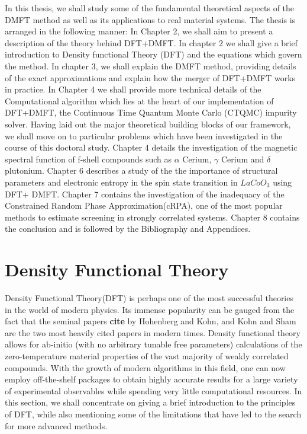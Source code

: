 \documentclass[12pt,a4paper]{article}
\begin{document}
In this thesis, we shall study some of the fundamental theoretical aspects of the DMFT method as well as its applications to real material systems. The thesis is arranged in the following manner: In Chapter 2, we shall aim to present a description of the theory behind DFT+DMFT. In chapter 2 we shall give a brief introduction to Density functional Theory (DFT) and the equations which govern the method. In chapter 3, we shall explain the DMFT method, providing details of the exact approximations and explain how the merger of DFT+DMFT works in practice. In Chapter 4 we shall provide more technical details of the Computational algorithm which lies at the heart of our implementation of DFT+DMFT, the Continuous Time Quantum Monte Carlo (CTQMC) impurity solver. Having laid out the major theoretical building blocks of our framework, we shall move on to particular problems which have been investigated in the course of this doctoral study. Chapter 4 details the investigation of the magnetic spectral function of f-shell compounds such as $\alpha$ Cerium, $\gamma$ Cerium and $\delta$ plutonium. Chapter 6 describes a study of the the importance of structural parameters and electronic entropy in the spin state transition in $LaCoO_3$ using DFT+ DMFT. Chapter 7 contains the investigation of the inadequacy of the Constrained Random Phase Approximation(cRPA), one of the most popular methods to estimate screening in strongly correlated systems. Chapter 8 contains the conclusion and is followed by the Bibliography and Appendices.


\pagebreak
\section{Density Functional Theory}

Density Functional Theory(DFT) is perhaps one of the most successful theories in the world of modern physics. Its immense popularity can be gauged from the fact that the seminal papers \textbf{cite} by Hohenberg and Kohn, and Kohn and Sham are the two most heavily cited papers in modern times. Density functional theory allows for ab-initio (with no arbitrary tunable free parameters) calculations of the zero-temperature material properties of the vast majority of weakly correlated compounds. With the growth of modern algorithms in this field, one can now employ off-the-shelf packages to obtain highly accurate results for a large variety of experimental observables while spending very little computational resources. In this section, we shall concentrate on giving a brief introduction to the principles of DFT, while also mentioning some of the limitations that have led to the search for more advanced methods.
\end{document}
